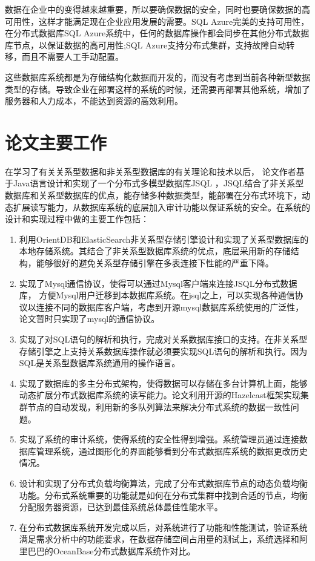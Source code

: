 	数据在企业中的变得越来越重要，所以要确保数据的安全，同时也要确保数据的高可用性，这样才能满足现在企业应用发展的需要。SQL Azure完美的支持可用性，在分布式数据库SQL Azure系统中，任何的数据库操作都会同步在其他分布式数据库节点，以保证数据的高可用性;SQL Azure支持分布式集群，支持故障自动转移，而且不需要人工手动配置。
	
	这些数据库系统都是为存储结构化数据而开发的，而没有考虑到当前各种新型数据类型的存储。导致企业在部署这样的系统的时候，还需要再部署其他系统，增加了服务器和人力成本，不能达到资源的高效利用。
\section{论文主要工作}
在学习了有关关系型数据和非关系型数据库的有关理论和技术以后，
论文作者基于Java语言设计和实现了一个分布式多模型数据库JSQL
，JSQL结合了非关系型数据库和关系型数据库的优点，能存储多种数据类型，能部署在分布式环境下，动态扩展读写能力，从数据库系统的底层加入审计功能以保证系统的安全。在系统的设计和实现过程中做的主要工作包括：
\begin{enumerate}[fullwidth,itemindent=2em]
	\item 利用OrientDB和ElasticSearch非关系型存储引擎设计和实现了关系型数据库的本地存储系统。其结合了非关系型数据库系统的优点，底层采用新的存储结构，能够很好的避免关系型存储引擎在多表连接下性能的严重下降。
	\item 实现了Mysql通信协议，使得可以通过Mysql客户端来连接JSQL分布式数据库，
	方便Mysql用户迁移到本数据库系统。在jsql之上，可以实现各种通信协议以连接不同的数据库客户端，考虑到开源mysql数据库系统使用的广泛性，论文暂时只实现了mysql的通信协议。
	\item 实现了对SQL语句的解析和执行，完成对关系数据库接口的支持。在非关系型存储引擎之上支持关系数据库操作就必须要实现SQL语句的解析和执行。因为SQL是关系型数据库系统通用的操作语言。
	\item 实现了数据库的多主分布式架构，使得数据可以存储在多台计算机上面，能够动态扩展分布式数据库系统的读写能力。论文利用开源的Hazelcast框架实现集群节点的自动发现，利用新的多队列算法来解决分布式系统的数据一致性问题。
	\item 实现了系统的审计系统，使得系统的安全性得到增强。系统管理员通过连接数据库管理系统，通过图形化的界面能够看到分布式数据库系统的数据更改历史情况。
	\item 设计和实现了分布式负载均衡算法，完成了分布式数据库节点的动态负载均衡功能。分布式系统重要的功能就是如何在分布式集群中找到合适的节点，均衡分配服务器资源，已达到最佳系统总体最佳性能水平。
	\item 在分布式数据库系统开发完成以后，对系统进行了功能和性能测试，验证系统满足需求分析中的功能要求，在数据存储空间占用量的测试上，系统选择和阿里巴巴的OceanBase分布式数据库系统作对比。
\end{enumerate}
